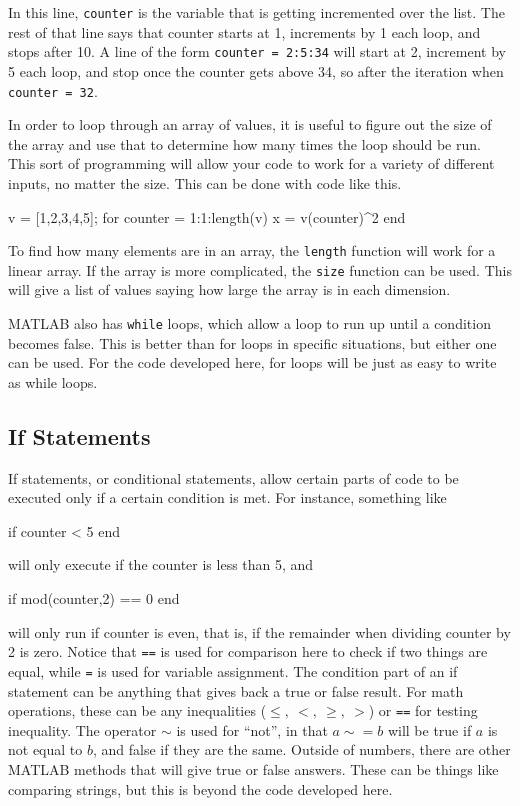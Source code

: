 In this line, \texttt{counter} is the variable that is getting incremented over the list. The rest of that line says that counter starts at 1, increments by 1 each loop, and stops after 10. A line of the form \texttt{counter = 2:5:34} will start at 2, increment by 5 each loop, and stop once the counter gets above 34, so after the iteration when \texttt{counter = 32}.

In order to loop through an array of values, it is useful to figure out the size of the array and use that to determine how many times the loop should be run. This sort of programming will allow your code to work for a variety of different inputs, no matter the size. This can be done with code like this.
\begin{matlab}
v = [1,2,3,4,5]; %
for counter = 1:1:length(v)
    x = v(counter)^2
end
\end{matlab}

To find how many elements are in an array, the \texttt{length} function will work for a linear array. If the array is more complicated, the \texttt{size} function can be used. This will give a list of values saying how large the array is in each dimension.

MATLAB also has \texttt{while} loops, which allow a loop to run up until a condition becomes false. This is better than for loops in specific situations, but either one can be used. For the code developed here, for loops will be just as easy to write as while loops. 

\subsection{If Statements}
If statements, or conditional statements, allow certain parts of code to be executed only if a certain condition is met. For instance, something like
\begin{matlab}
if counter < 5
end
\end{matlab}
will only execute if the counter is less than 5, and
\begin{matlab}
if mod(counter,2) == 0
end
\end{matlab}
will only run if counter is even, that is, if the remainder when dividing counter by 2 is zero. Notice that \texttt{==} is used for comparison here to check if two things are equal, while \texttt{=} is used for variable assignment. The condition part of an if statement can be anything that gives back a true or false result. For math operations, these can be any inequalities ($\leq, \ <,\ \geq, \ >$) or \texttt{==} for testing inequality. The operator $\sim$ is used for ``not'', in that $a \sim= b$ will be true if $a$ is not equal to $b$, and false if they are the same. Outside of numbers, there are other MATLAB methods that will give true or false answers. These can be things like comparing strings, but this is beyond the code developed here.  

